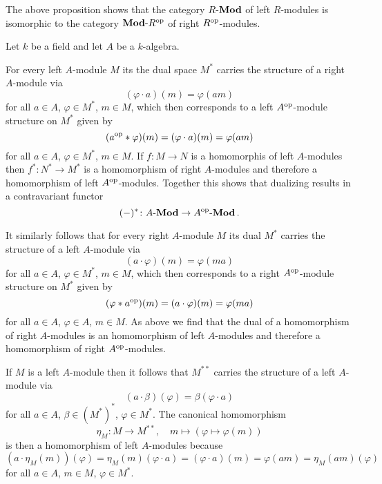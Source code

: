 \begin{remark}
  The above proposition shows that the category $R\text{-}\mathbf{Mod}$ of left $R$-modules is isomorphic to the category $\mathbf{Mod}\text{-}R^{\operatorname{op}}$ of right $R^{\operatorname{op}}$-modules.
\end{remark}


\begin{example}
  Let $k$ be a field and let $A$ be a $k$-algebra.
  
  For every left $A$-module $M$ its the dual space $M^*$ carries the structure of a right $A$-module via
  \[
      (\varphi \cdot a)(m)
    = \varphi(am)
  \]
  for all $a \in A$, $\varphi \in M^*$, $m \in M$, which then corresponds to a left $A^{\operatorname{op}}$-module structure on $M^*$ given by
  \[
      (a^{\operatorname{op}} * \varphi)(m)
    = (\varphi \cdot a)(m)
    = \varphi(a m)
  \]
  for all $a \in A$, $\varphi \in M^*$, $m \in M$.
  If $f \colon M \to N$ is a homomorphis of left $A$-modules then $f^* \colon N^* \to M^*$ is a homomorphism of right $A$-modules and therefore a homomorphism of left $A^{\operatorname{op}}$-modules.
  Together this shows that dualizing results in a contravariant functor
  \[
            (-)^*
    \colon  A\text{-}\mathbf{Mod}
    \to     A^{\operatorname{op}}\text{-}\mathbf{Mod} \,.
  \]
  
  It similarly follows that for every right $A$-module $M$ its dual $M^*$ carries the structure of a left $A$-module via
  \[
      (a \cdot \varphi)(m)
    = \varphi(m a)
  \]
  for all $a \in A$, $\varphi \in M^*$, $m \in M$, which then corresponds to a right $A^{\operatorname{op}}$-module structure on $M^*$ given by
  \[
      (\varphi * a^{\operatorname{op}})(m)
    = (a \cdot \varphi)(m)
    = \varphi(m a)
  \]
  for all $a \in A$, $\varphi \in A$, $m \in M$.
  As above we find that the dual of a homomorphism of right $A$-modules is an homomorphism of left $A$-modules and therefore a homomorphism of right $A^{\operatorname{op}}$-modules.
  
  If $M$ is a left $A$-module then it follows that $M^{**}$ carries the structure of a left $A$-module via
  \[
      (a \cdot \beta)(\varphi)
    = \beta(\varphi \cdot a)
  \]
  for all $a \in A$, $\beta \in (M^*)^*$, $\varphi \in M^*$.
  The canonical homomorphism
  \[
            \eta_M
    \colon  M
    \to     M^{**},
    \quad   m
    \mapsto (\varphi \mapsto \varphi(m))
  \]
  is then a homomorphism of left $A$-modules because
  \[
      (a \cdot \eta_M(m))(\varphi)
    = \eta_M(m)(\varphi \cdot a)
    = (\varphi \cdot a)(m)
    = \varphi(a m)
    = \eta_M(a m)(\varphi)
  \]
  for all $a \in A$, $m \in M$, $\varphi \in M^*$.
  

\end{example}
